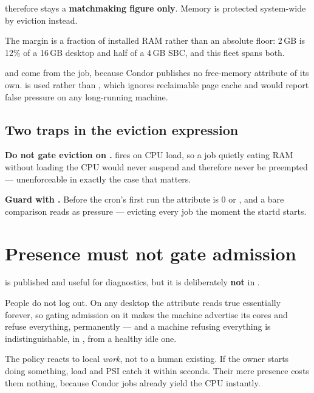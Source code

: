  therefore stays a \textbf{matchmaking figure only}. Memory
is protected system-wide by eviction instead.

The margin is a fraction of installed RAM rather than an absolute floor: 2\,GB is
12\% of a 16\,GB desktop and half of a 4\,GB SBC, and this fleet spans both.

 and  come from the  job,
because Condor publishes no free-memory attribute of its own. 
is used rather than , which ignores reclaimable page cache and would
report false pressure on any long-running machine.

\subsection{Two traps in the eviction expression}

\begin{trap}
\textbf{Do not gate eviction on .}  fires
on CPU load, so a job quietly eating RAM without loading the CPU would never
suspend and therefore never be preempted --- unenforceable in exactly the case
that matters.
\end{trap}

\begin{trap}
\textbf{Guard with .} Before the cron's first run the
attribute is 0 or , and a bare comparison reads as pressure ---
evicting every job the moment the startd starts.
\end{trap}

\section{Presence must not gate admission}

 is published and useful for diagnostics, but it is
deliberately \textbf{not} in .

People do not log out. On any desktop the attribute reads true essentially
forever, so gating admission on it makes the machine advertise its cores and
refuse everything, permanently --- and a machine refusing everything is
indistinguishable, in , from a healthy idle one.

The policy reacts to local \emph{work}, not to a human existing. If the owner
starts doing something, load and PSI catch it within seconds. Their mere
presence costs them nothing, because Condor jobs already yield the CPU instantly.

